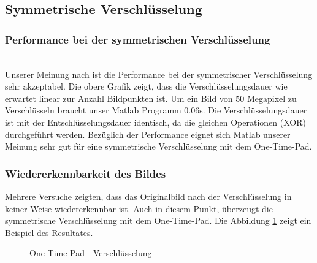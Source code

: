 \documentclass[paper=a4,fontsize=12pt]{scrartcl}
\begin{document}
\subsection{Symmetrische Verschlüsselung}
\subsubsection{Performance bei der symmetrischen Verschlüsselung}
 \\
Unserer Meinung nach ist die Performance bei der symmetrischer Verschlüsselung sehr akzeptabel.
Die obere Grafik zeigt, dass die Verschlüsselungsdauer wie erwartet linear zur Anzahl Bildpunkten ist.
Um ein Bild von 50 Megapixel zu Verschlüsseln braucht unser Matlab Programm 0.06s.
Die Verschlüsselungsdauer ist mit der Entschlüsselungsdauer identisch, da die gleichen Operationen (XOR) durchgeführt werden.
Bezüglich der Performance eignet sich Matlab unserer Meinung sehr gut für eine symmetrische Verschlüsselung mit dem One-Time-Pad.

\subsubsection{Wiedererkennbarkeit des Bildes}
Mehrere Versuche zeigten, dass das Originalbild nach der Verschlüsselung in keiner Weise wiedererkennbar ist.
Auch in diesem Punkt, überzeugt die symmetrische Verschlüsselung mit dem One-Time-Pad.
Die Abbildung \ref{sym-enc-result} zeigt ein Beispiel des Resultates.
\begin{figure}[H] 
	\centering
	\caption[One Time Pad - Verschlüsselung]{One Time Pad - Verschlüsselung}  
	\label{sym-enc-result} 
\end{figure}
\end{document}
